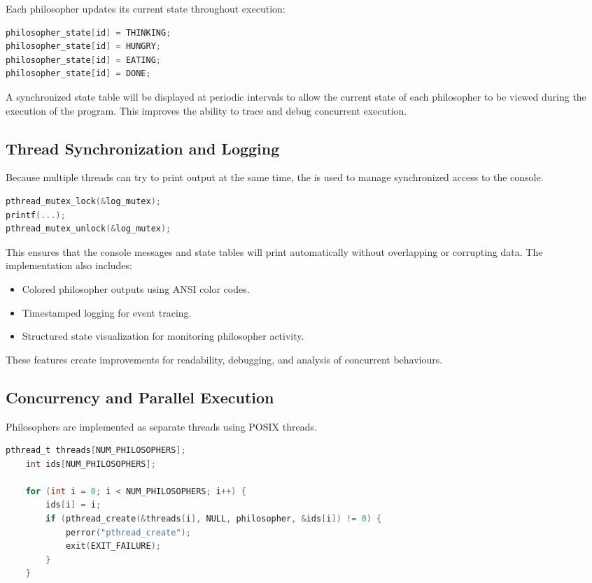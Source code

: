 \documentclass[11pt,a4paper]{article}
\newcommand{\code}[1]{\tcbox[on line, boxsep=1pt, left=1pt, right=1pt, top=1pt, bottom=1pt, colback=inlinegray, colframe=inlinegray, fontupper=\ttfamily\small]{#1}}
\begin{document}
\begin{multicols*}{2}
Each philosopher updates its current state throughout execution:
\begin{lstlisting}[language=C, caption=State Updates]
philosopher_state[id] = THINKING;
philosopher_state[id] = HUNGRY;
philosopher_state[id] = EATING;
philosopher_state[id] = DONE;
\end{lstlisting}

A synchronized state table will be displayed at periodic intervals to allow the current state of each philosopher to be viewed during the execution of the program. This improves the ability to trace and debug concurrent execution.

\subsection{Thread Synchronization and Logging}
Because multiple threads can try to print output at the same time, the \code{log\_mutex} is used to manage synchronized access to the console.

\begin{lstlisting}[language=C, caption=Synchronized Logging]
pthread_mutex_lock(&log_mutex);
printf(...);
pthread_mutex_unlock(&log_mutex);
\end{lstlisting}

This ensures that the console messages and state tables will print automatically without overlapping or corrupting data. The implementation also includes:
\begin{itemize}
    \item Colored philosopher outputs using ANSI color codes.
    \item Timestamped logging for event tracing.
    \item Structured state visualization for monitoring philosopher activity.
\end{itemize}
These features create improvements for readability, debugging, and analysis of concurrent behaviours.

\subsection{Concurrency and Parallel Execution}
Philosophers are implemented as separate threads using POSIX threads.

\begin{lstlisting}[language=C, caption=Thread Creation]
pthread_t threads[NUM_PHILOSOPHERS];
    int ids[NUM_PHILOSOPHERS];

    for (int i = 0; i < NUM_PHILOSOPHERS; i++) {
        ids[i] = i;
        if (pthread_create(&threads[i], NULL, philosopher, &ids[i]) != 0) {
            perror("pthread_create");
            exit(EXIT_FAILURE);
        }
    }
\end{lstlisting}


\end{multicols*}
\end{document}
